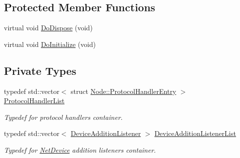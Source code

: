 \subsection*{Protected Member Functions}
\begin{DoxyCompactItemize}
\item 
virtual void \hyperlink{classns3_1_1Node_a7439dab03d43c058044f1f95154c6645}{Do\+Dispose} (void)
\item 
virtual void \hyperlink{classns3_1_1Node_aad661eab906e49c8b9faee7fd9504fad}{Do\+Initialize} (void)
\end{DoxyCompactItemize}
\subsection*{Private Types}
\begin{DoxyCompactItemize}
\item 
typedef std\+::vector$<$ struct \hyperlink{structns3_1_1Node_1_1ProtocolHandlerEntry}{Node\+::\+Protocol\+Handler\+Entry} $>$ \hyperlink{classns3_1_1Node_a338edb0211416a2ec60a2988c527f729}{Protocol\+Handler\+List}
\begin{DoxyCompactList}\small\item\em Typedef for protocol handlers container. \end{DoxyCompactList}\item 
typedef std\+::vector$<$ \hyperlink{classns3_1_1Node_a29fd546b16195fd0ac8848ee107b5bc0}{Device\+Addition\+Listener} $>$ \hyperlink{classns3_1_1Node_a0c4d3ac6f525874c6d1bbde6d086193a}{Device\+Addition\+Listener\+List}
\begin{DoxyCompactList}\small\item\em Typedef for \hyperlink{classns3_1_1NetDevice}{Net\+Device} addition listeners container. \end{DoxyCompactList}\end{DoxyCompactItemize}
